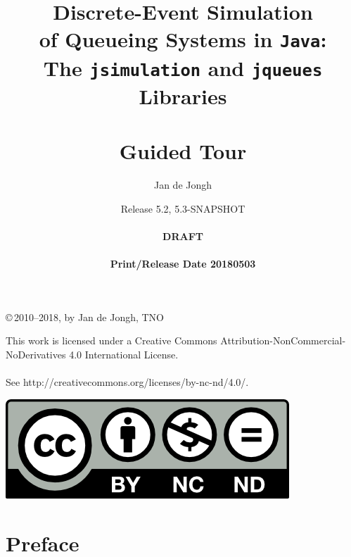 \documentclass[12pt]{book}
\title{Discrete-Event Simulation\\
       of Queueing Systems in \texttt{Java}:\\
       The \texttt{jsimulation}
       and
       \texttt{jqueues}
       Libraries\\
       \mbox{ } \\
       Guided Tour}
\author{Jan de Jongh}
\date{Release 5.2, 5.3-SNAPSHOT\\
	  \mbox{ } \\
	  {\bf DRAFT}\\
	  \mbox{ }
	  \\{\bf Print/Release Date 20180503}}
\begin{document}
\maketitle

{%
	\vspace*{130mm}
	\thispagestyle{empty}
	\setlength{\parindent}{0pt}
	\copyright\,2010--2018, by Jan de Jongh, TNO
	\vspace*{40mm}
}%

\begin{mdframed}[
  outerlinecolor=black,
  outerlinewidth=2pt,
  linecolor=cccolor,
  middlelinewidth=3pt,
  roundcorner=10pt]
This work is licensed under a Creative Commons
  Attribution-NonCommercial-NoDerivatives
  4.0 International License.\\
  \\
See http://creativecommons.org/licenses/by-nc-nd/4.0/.
  \\
\begin{center}
  \includegraphics[scale=2]{fig/by-nc-nd}
\end{center}
\end{mdframed}


\chapter*{Preface}
\label{chap:preface}

\end{document}
